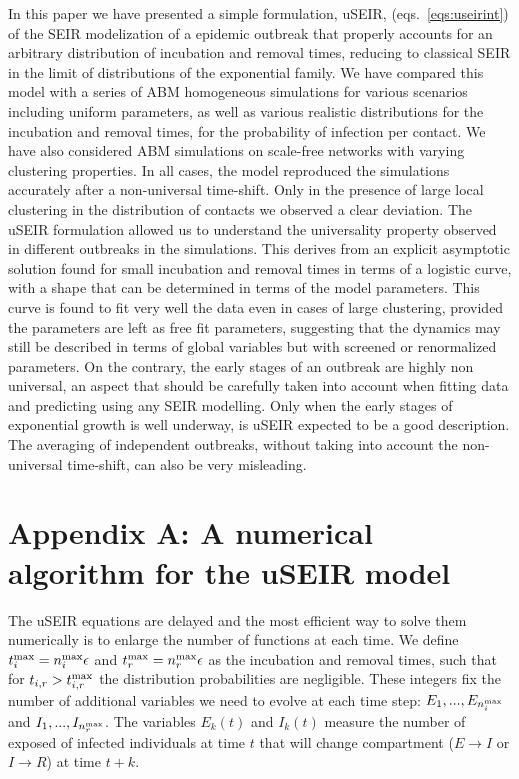 \documentclass[a4paper,oneside,11pt]{article}
\begin{document}
In this paper we have presented a simple formulation, uSEIR,  (eqs.~\ref{eqs:useirint}) of the SEIR modelization of a epidemic outbreak that properly accounts for an arbitrary distribution of incubation and removal times, reducing to classical SEIR in the limit of distributions of the exponential family.  We have compared this model with a series of ABM homogeneous simulations for various scenarios including uniform parameters, as well as various realistic distributions for the incubation and removal times,  for the probability of infection per contact. We have also considered ABM simulations on scale-free networks with varying 
 clustering properties. In all cases, the model reproduced the simulations accurately after a non-universal time-shift. Only in the presence of large local clustering in the distribution of contacts we observed a clear deviation. The uSEIR formulation allowed
us to understand the universality property observed in different outbreaks in the simulations. This derives from an explicit asymptotic solution found for small incubation and removal times in terms of a logistic curve, with a shape that can be determined in terms of the model parameters. This curve is found to fit very well the data  even in cases of large clustering, provided the parameters are left as free fit parameters, suggesting that the dynamics may still be described in terms of global variables but with  screened or renormalized parameters. On the contrary, the early stages of an outbreak  are highly non universal, an aspect that should be carefully taken into account when fitting data and predicting using any SEIR modelling. Only  when the early stages of exponential growth is well underway, is uSEIR expected to be a good description. The averaging of independent outbreaks, without taking into account the non-universal time-shift, can also be very misleading.

\section*{Appendix A: A numerical algorithm for the uSEIR model}
\label{sec:appendix}

The uSEIR equations are delayed and the most efficient way to solve them numerically is to enlarge the number of functions at each time. We define $t_i^{\rm max}=n_i^{\rm max} \epsilon$ and $t_r^{\rm max}=n_r^{\rm max} \epsilon$ as the incubation and removal times, such that for $t_{i,r}> t_{i,r}^{\rm max}$ the distribution probabilities are negligible.
These integers fix the number of additional variables we need to evolve at each time step: $E_1,...,E_{n_i^{\rm max}}$ and $I_1,...,I_{n_r^{\rm max}}$. The variables $E_k(t)$ and $I_k(t)$ measure the number of exposed of infected individuals at time $t$ that will change compartment ($E\rightarrow I$ or $I \rightarrow R$) at time $t+k$.
\end{document}
